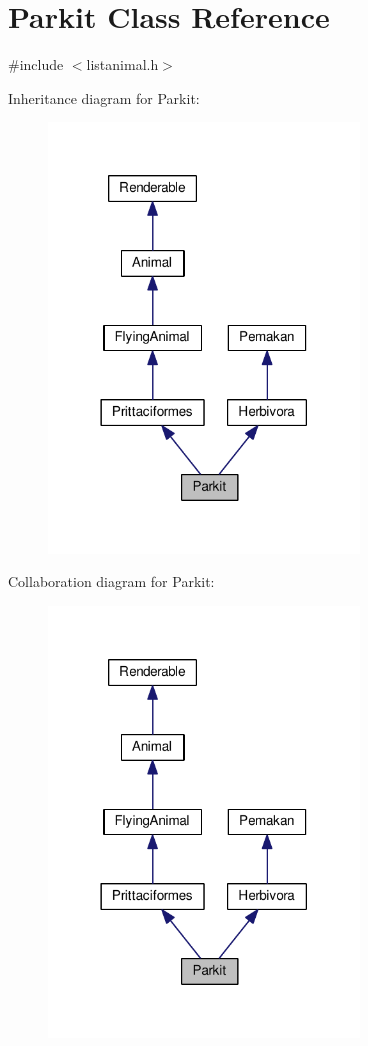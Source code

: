 \hypertarget{classParkit}{}\section{Parkit Class Reference}
\label{classParkit}


{\ttfamily \#include $<$listanimal.\+h$>$}



Inheritance diagram for Parkit\+:
\nopagebreak
\begin{figure}[H]
\begin{center}
\leavevmode
\includegraphics[width=234pt]{classParkit__inherit__graph}
\end{center}
\end{figure}


Collaboration diagram for Parkit\+:
\nopagebreak
\begin{figure}[H]
\begin{center}
\leavevmode
\includegraphics[width=234pt]{classParkit__coll__graph}
\end{center}
\end{figure}

